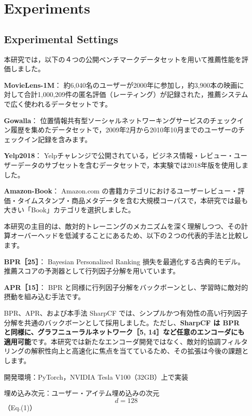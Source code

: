 \documentclass[11pt,a4paper]{article}
\begin{document}
\section{Experiments}

\subsection{Experimental Settings}
本研究では，以下の４つの公開ベンチマークデータセットを用いて推薦性能を評価しました。

\textbf{MovieLens-1M}：
約6,040名のユーザーが2000年に参加し，約3,900本の映画に対して合計1,000,209件の匿名評価（レーティング）が記録された，推薦システムで広く使われるデータセットです。

\textbf{Gowalla}：
位置情報共有型ソーシャルネットワーキングサービスのチェックイン履歴を集めたデータセットで，2009年2月から2010年10月までのユーザーのチェックイン記録を含みます。

\textbf{Yelp2018}：
Yelpチャレンジで公開されている，ビジネス情報・レビュー・ユーザーデータのサブセットを含むデータセットで，本実験では2018年版を使用しました。

\textbf{Amazon-Book}：
Amazon.com の書籍カテゴリにおけるユーザーレビュー・評価・タイムスタンプ・商品メタデータを含む大規模コーパスで，本研究では最も大きい「Book」カテゴリを選択しました。

本研究の主目的は、敵対的トレーニングのメカニズムを深く理解しつつ、その計算オーバーヘッドを低減することにあるため、以下の２つの代表的手法と比較します。

\textbf{BPR［25］}：
Bayesian Personalized Ranking 損失を最適化する古典的モデル。推薦スコアの予測器として行列因子分解を用いています。

\textbf{APR［15］}：
BPR と同様に行列因子分解をバックボーンとし、学習時に敵対的摂動を組み込む手法です。

BPR、APR、および本手法 SharpCF では、シンプルかつ有効性の高い行列因子分解を共通のバックボーンとして採用しました。ただし、\textbf{SharpCF は BPR と同様に、グラフニューラルネットワーク［5, 14］など任意のエンコーダにも適用可能}です。本研究では新たなエンコーダ開発ではなく、敵対的協調フィルタリングの解釈性向上と高速化に焦点を当てているため、その拡張は今後の課題とします。

開発環境：PyTorch，NVIDIA Tesla V100（32GB）上で実装

埋め込み次元：ユーザー・アイテム埋め込みの次元
\begin{equation}
d = 128
\end{equation}
（Eq.(1)）
\end{document}
